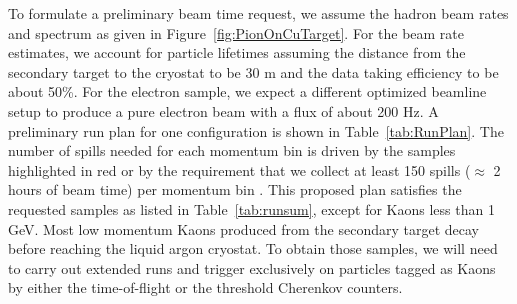 To formulate a preliminary beam time request, we assume the hadron beam rates and spectrum as given in Figure~\ref{fig:PionOnCuTarget}. For the beam rate estimates, we account for particle lifetimes assuming the distance from the secondary target to the cryostat to be 30 m and the data taking efficiency to be about 50\%. For the electron sample, we expect a different optimized beamline setup to produce a pure electron beam with a flux of about 200 Hz. A preliminary run plan for one configuration is shown in Table~\ref{tab:RunPlan}. The number of spills needed for each momentum bin is driven by the samples highlighted in red or by the requirement that we collect at least 150 spills ($\approx$ 2 hours of beam time) per momentum bin . This proposed plan satisfies the requested samples as listed in Table~\ref{tab:runsum}, except for Kaons less than 1 GeV. Most low momentum Kaons produced from the secondary target decay before reaching the liquid argon cryostat. To obtain those samples, we will need to carry out extended runs and trigger exclusively on particles tagged as Kaons by either the time-of-flight or the threshold Cherenkov counters.

